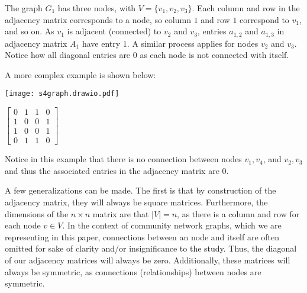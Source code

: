 \documentclass{article}
\begin{document}
\bigskip

The graph $G_1$ has three nodes, with $V = \{ v_1, v_2, v_3\}$.
Each column and row in the adjacency matrix corresponds to a node, so column $1$ and row $1$ correspond to $v_1$, and so on.
As $v_1$ is adjacent (connected) to $v_2$ and $v_3$, entries $a_{1,2}$ and $a_{1,3}$ in adjacency matrix $A_1$ have entry $1$. 
A similar process applies for nodes $v_2$ and $v_3$. 
Notice how all diagonal entries are $0$ as each node is not connected with itself.

\bigskip 
\noindent A more complex example is shown below:

\bigskip

\noindent\begin{minipage}{.5\textwidth}
\centering
\texttt{[image: s4graph.drawio.pdf]}
\label{fig:fig3}            
\end{minipage}%
\begin{minipage}{.5\textwidth}
\centering
\vspace{1cm}
 $\begin{bmatrix}
0 & 1 & 1 & 0\\
1 & 0 & 0 & 1\\
1 & 0 & 0 & 1\\
0 & 1 & 1 & 0
\end{bmatrix}$
\vspace{0.88cm}

\label{fig:fig4}            
\end{minipage}

\bigskip

\noindent Notice in this example that there is no connection between nodes $v_1, v_4$, and $v_2, v_3$ and thus the associated entries in the adjacency matrix are $0$.

\bigskip 
A few generalizations can be made. The first is that by construction of the adjacency matrix, they will always be square matrices.
Furthermore, the dimensions of the $n \times n$ matrix are that $|V| = n$, as there is a column and row for each node $v \in V$.
In the context of community network graphs, which we are representing in this paper, connections between an node and itself are often omitted for sake of clarity and/or insignificance to the study.
Thus, the diagonal of our adjacency matrices will always be zero. Additionally, these matrices will always be symmetric, as connections (relationships) between nodes are symmetric.
\end{document}
